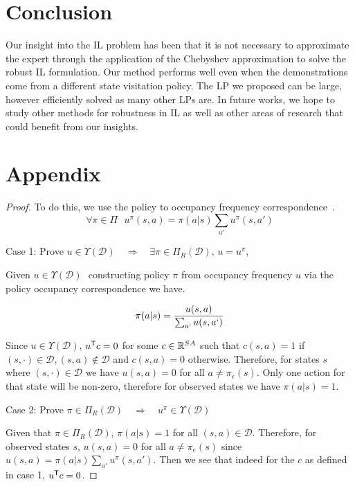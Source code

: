 \documentclass[10pt]{article}
\renewcommand{\cite}{\citep}
\begin{document}
\section{Conclusion}
Our insight into the IL problem has been that it is not necessary to approximate the expert through the application of the Chebyshev approximation to solve the robust IL formulation. 
Our method performs well even when the demonstrations come from a different state visitation policy.
The LP we proposed can be large, however efficiently solved as many other LPs are.
In future works, we hope to study other methods for robustness in IL as well as other areas of research that could benefit from our insights.

%


\section{Appendix}
\lemmaOccupancyExistance*
\begin{proof}
	To do this, we use the policy to occupancy frequency correspondence~\cite{Puterman1994}.
	\[\forall \pi \in \Pi \,\,\,\, u^\pi(s,a) = \pi(a|s)\sum_{a'}{u^\pi(s,a')}\]

	Case 1: Prove $u \in \Upsilon (\mathcal{D})  \quad \Rightarrow \quad  \exists
		\pi \in \Pi_R(\mathcal{D}), \, u = u^{\pi}$,

	Given $u \in \Upsilon (\mathcal{D})\,\,$ constructing policy $\pi$ from
	occupancy frequency $u$ via the policy occupancy correspondence we have.

	\[\pi(a|s) = \frac{u(s,a)}{\sum_{a`}u(s,a`)}\]

	Since $u \in \Upsilon (\mathcal{D})$, $u^{\mathsf{T}} c = 0$ for some $c \in \mathbb{R}^{SA}$ such that
	$c(s,a) = 1$ if $(s,\cdot) \in \mathcal{D}, (s,a) \notin \mathcal{D}$ and $c(s,a) = 0$ otherwise.
	Therefore, for states $s$ where $(s,\cdot) \in \mathcal{D}$ we have $u(s,a) = 0$ for all $a \not= \pi_e(s)$.
	Only one action for that state will be non-zero, therefore for observed states we have $\pi(a|s) = 1$.

	Case 2: Prove $\pi \in \Pi_R(\mathcal{D}) \quad \Rightarrow \quad  u^\pi \in
		\Upsilon (\mathcal{D})$

	Given that $\pi \in \Pi_R(\mathcal{D})$, $\pi(a|s) = 1$ for all $(s,a) \in \mathcal{D}$. Therefore, for observed states $s$, $u(s,a) = 0$ for all $a \not= \pi_e(s)$
	since $u(s,a) = \pi(a|s)\sum_{a'}{u^\pi(s,a')}$. Then we see that indeed for the $c$ as defined in case 1, $u^{\mathsf{T}} c = 0$.
\end{proof}
\end{document}
